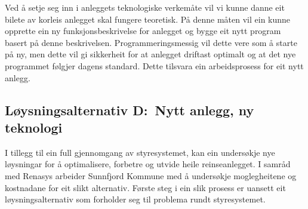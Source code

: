 Ved å setje seg inn i anleggets teknologiske verkemåte vil vi kunne danne eit bilete av korleis anlegget skal fungere teoretisk.
På denne måten vil ein kunne opprette ein ny funksjonsbeskrivelse for anlegget og bygge eit nytt program basert på denne beskrivelsen.
Programmeringsmessig vil dette vere som å starte på ny, men dette vil gi sikkerheit for at anlegget driftast optimalt og at det nye programmet følgjer
dagens standard. Dette tilsvara ein arbeidsprosess for eit nytt anlegg.

\newpage
\subsection{Løysningsalternativ D:~Nytt anlegg, ny teknologi}
I tillegg til ein full gjennomgang av styresystemet, 
kan ein undersøkje nye løysningar for å optimalisere, forbetre og utvide heile reinseanlegget.
I samråd med \gls{Renasys} arbeider \gls{Sunnfjord Kommune} med å undersøkje moglegheitene og kostnadane for eit slikt alternativ.
Første steg i ein slik prosess er uansett eit løysningsalternativ som forholder seg til problema rundt styresystemet.


